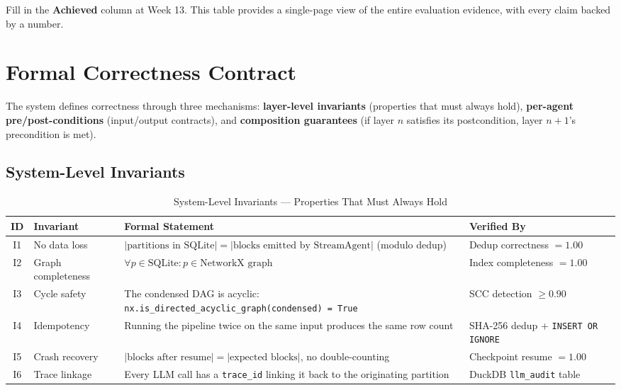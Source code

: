 \documentclass[11pt,a4paper]{article}
\begin{document}
\begin{infobox}
Fill in the \textbf{Achieved} column at Week 13. This table provides a single-page view of the entire evaluation evidence, with every claim backed by a number.
\end{infobox}


\section{Formal Correctness Contract}

The system defines correctness through three mechanisms: \textbf{layer-level invariants} (properties that must always hold), \textbf{per-agent pre/post-conditions} (input/output contracts), and \textbf{composition guarantees} (if layer $n$ satisfies its postcondition, layer $n{+}1$'s precondition is met).

\subsection{System-Level Invariants}

\begin{table}[H]
\centering
\caption{System-Level Invariants — Properties That Must Always Hold}
\renewcommand{\arraystretch}{1.3}
\small
\begin{tabularx}{\textwidth}{@{} c L{3.2cm} X l @{}}
\toprule
\textbf{ID} & \textbf{Invariant} & \textbf{Formal Statement} & \textbf{Verified By} \\
\midrule
I1 & No data loss & $|\text{partitions in SQLite}| = |\text{blocks emitted by StreamAgent}|$ (modulo dedup) & Dedup correctness $= 1.00$ \\
I2 & Graph completeness & $\forall p \in \text{SQLite}: p \in \text{NetworkX graph}$ & Index completeness $= 1.00$ \\
I3 & Cycle safety & The condensed DAG is acyclic: \texttt{nx.is\_directed\_acyclic\_graph(condensed) = True} & SCC detection $\geq 0.90$ \\
I4 & Idempotency & Running the pipeline twice on the same input produces the same row count & SHA-256 dedup + \texttt{INSERT OR IGNORE} \\
I5 & Crash recovery & $|\text{blocks after resume}| = |\text{expected blocks}|$, no double-counting & Checkpoint resume $= 1.00$ \\
I6 & Trace linkage & Every LLM call has a \texttt{trace\_id} linking it back to the originating partition & DuckDB \texttt{llm\_audit} table \\
\bottomrule
\end{tabularx}
\end{table}
\end{document}
